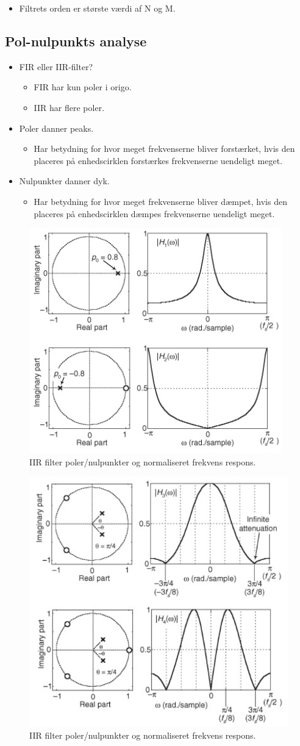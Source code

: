 \documentclass[danish]{article}
\begin{document}
\begin{itemize}
	\item Filtrets orden er største værdi af N og M.
\end{itemize}

\subsection{Pol-nulpunkts analyse}
\begin{itemize}
	\item FIR eller IIR-filter?
	\begin{itemize}
		\item FIR har kun poler i origo.
		\item IIR har flere poler.
	\end{itemize}
	\item Poler danner peaks.
	\begin{itemize}
		\item Har betydning for hvor meget frekvenserne bliver forstærket, hvis den placeres på enhedscirklen forstærkes frekvenserne uendeligt meget.
	\end{itemize}
	\item Nulpunkter danner dyk.
	\begin{itemize}
		\item Har betydning for hvor meget frekvenserne bliver dæmpet, hvis den placeres på enhedscirklen dæmpes frekvenserne uendeligt meget.
	\end{itemize}
\end{itemize}

\begin{figure}[H]
	\centering
	\includegraphics[width=0.4\linewidth]{graphics/iir_pz1}
	\caption{IIR filter poler/nulpunkter og normaliseret frekvens respons.}
	\label{fig:iir_pz1}
\end{figure}

\begin{figure}[H]
	\centering
	\includegraphics[width=0.4\linewidth]{graphics/iir_pz2}
	\caption{IIR filter poler/nulpunkter og normaliseret frekvens respons.}
	\label{fig:iir_pz2}
\end{figure}
\end{document}
